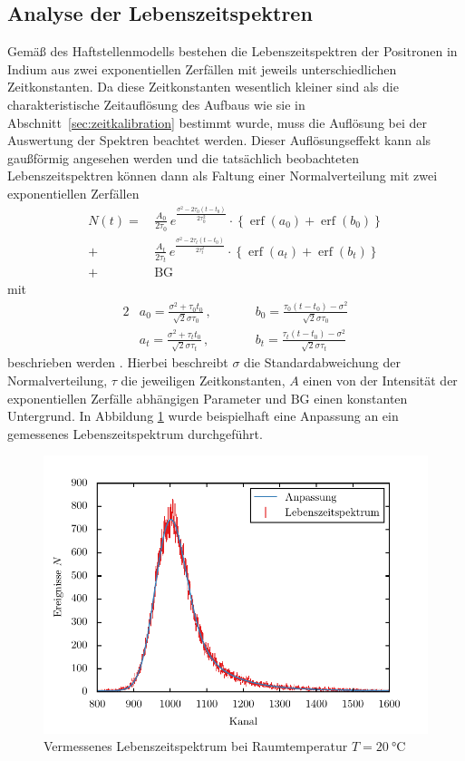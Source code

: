 \documentclass[11pt, a4paper]{article}
\numberwithin{equation}{section}
\DeclareMathOperator{\erf}{erf}
\begin{document}
\subsection{Analyse der Lebenszeitspektren}
Gemäß des Haftstellenmodells bestehen die Lebenszeitspektren der Positronen in Indium aus zwei exponentiellen Zerfällen mit jeweils unterschiedlichen Zeitkonstanten.
Da diese Zeitkonstanten wesentlich kleiner sind als die charakteristische Zeitauflösung des Aufbaus wie sie in Abschnitt~\ref{sec:zeitkalibration} bestimmt wurde, muss die Auflösung bei der Auswertung der Spektren beachtet werden.
Dieser Auflösungseffekt kann als gaußförmig angesehen werden und die tatsächlich beobachteten Lebenszeitspektren können dann als Faltung einer Normalverteilung mit zwei exponentiellen Zerfällen
\begin{align}
	N(t) = \, &\frac{A_0}{2 \tau_0} \, e^{\frac{\sigma^2 - 2 \tau_0 (t - t_0)}{2 \tau_0^2}} \cdot \left\{ \erf(a_0) + \erf(b_0) \right\} \nonumber\\
	+ &\frac{A_t}{2 \tau_t} \, e^{\frac{\sigma^2 - 2 \tau_t (t - t_0)}{2 \tau_t^2}} \cdot \left\{ \erf(a_t) + \erf(b_t) \right\} \nonumber\\
	+ &\mathrm{BG}
	\label{eq:spektrum_fit}
\end{align}
mit
\begin{alignat*}{2}
	&a_0 = \frac{\sigma^2 + \tau_0 t_0}{\sqrt{2} \sigma \tau_0} \,\text{,} \qquad
	&&b_0 = \frac{\tau_0 (t - t_0) - \sigma^2}{\sqrt{2} \sigma \tau_0} \\
	&a_t = \frac{\sigma^2 + \tau_t t_0}{\sqrt{2} \sigma \tau_t} \,\text{,} \qquad
	&&b_t = \frac{\tau_t (t - t_0) - \sigma^2}{\sqrt{2} \sigma \tau_t}
\end{alignat*}
beschrieben werden \cite{add_infos}.
Hierbei beschreibt $\sigma$ die Standardabweichung der Normalverteilung, $\tau$ die jeweiligen Zeitkonstanten, $A$ einen von der Intensität der exponentiellen Zerfälle abhängigen Parameter und $\mathrm{BG}$ einen konstanten Untergrund.
In Abbildung \ref{fig:fit_lebenszeitspektrum} wurde beispielhaft eine Anpassung an ein gemessenes Lebenszeitspektrum durchgeführt.
\begin{figure}[h]
	\centering
	\includegraphics{./figures/lifetimes/raumtemperatur.pdf}
	\caption{Vermessenes Lebenszeitspektrum bei Raumtemperatur $T = \SI{20}{\degreeCelsius}$}
	\label{fig:fit_lebenszeitspektrum}
\end{figure}
\end{document}
